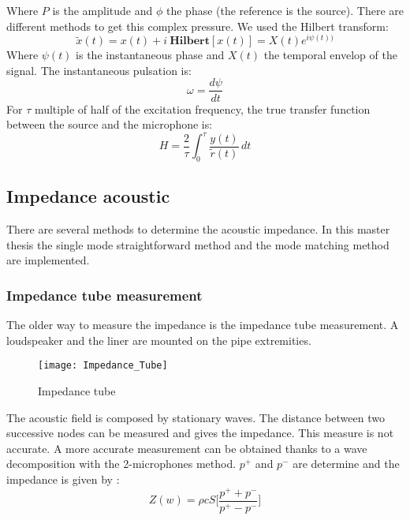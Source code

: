Where $P$ is the amplitude and $\phi$ the phase (the reference is the source).\smallbreak
There are different methods to get this complex pressure. We used the Hilbert transform:
\begin{equation}
    \widetilde{x}(t)=x(t)+i\ \textbf{Hilbert}[x(t)]=X(t)e^{i\psi(t))}
\end{equation}
Where $\psi(t)$ is the instantaneous phase and $X(t)$ the temporal envelop of the signal. The instantaneous pulsation is:
\begin{equation}
    \omega=\frac{d\psi}{dt}
\end{equation}
For $\tau$ multiple of half of the excitation frequency, the true transfer function between the source and the microphone is:
\begin{equation}
    H=\frac{2}{\tau}\int_0^{\tau}\! \frac{y(t)}{\widetilde{r}(t)} \, dt 
\end{equation}
\subsection{Impedance acoustic}
There are several methods to determine the acoustic impedance. In this master thesis the single mode straightforward method and the mode matching method are implemented.
\subsubsection{Impedance tube measurement}
The older way to measure the impedance is the impedance tube measurement. A loudspeaker and the liner are mounted on the pipe extremities.
\begin{figure}[H] \centering
    \texttt{[image: Impedance\_Tube]}
    \caption{Impedance tube}
\end{figure}
The acoustic field is composed by stationary waves. The distance between two successive nodes can be measured and gives the impedance. This measure is not accurate. A more accurate measurement can be obtained thanks to a wave decomposition with the 2-microphones method. $p^+$ and $p^-$ are determine and the impedance is given by \cite{Absorption_Coefficients_and_Impedance}: 
\begin{equation}
    Z(w)=\rho cS\Bigg[\frac{p^++p^-}{p^+-p^-}\Bigg]
\end{equation}
